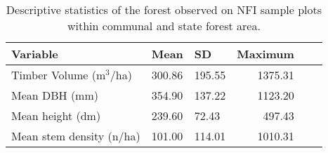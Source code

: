 
\begin{table}[ht]
	\centering
	\caption{Descriptive statistics of the forest observed on NFI sample plots within communal and state forest area.}
	\label{tab:fieldata}
	\begin{tabular}{lllrrr}
		\hline
		Variable & Mean & SD & Maximum \\ 
		\hline
Timber Volume (m$^3$/ha) & 300.86 & 195.55 & 1375.31 \\
Mean DBH (mm) & 354.90 & 137.22 & 1123.20 \\
Mean height (dm) & 239.60 & 72.43 & 497.43 \\
Mean stem density (n/ha) & 101.00  & 114.01 & 1010.31 \\
\hline
\hline
\end{tabular}
\end{table}